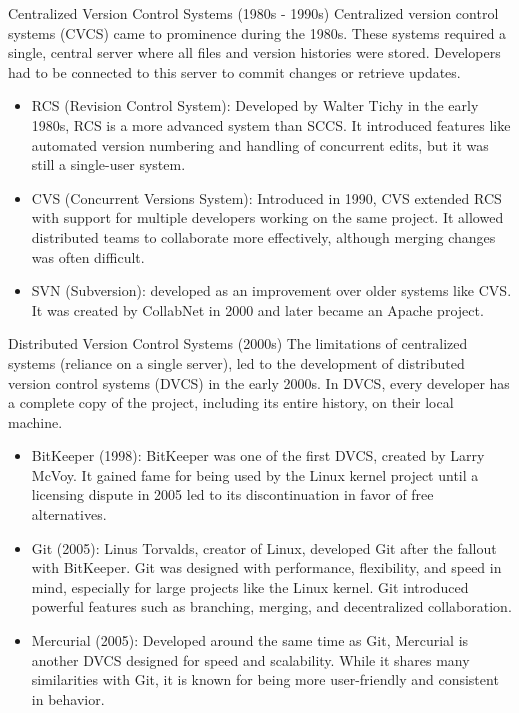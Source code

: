 \documentclass{beamer}
\begin{document}
\begin{frame}{Centralized Version Control Systems (1980s - 1990s)}
  Centralized version control systems (CVCS) came to prominence during the 1980s. These systems required a single, central server where all files and version histories were stored. Developers had to be connected to this server to commit changes or retrieve updates.
  \begin{itemize}
    \item RCS (Revision Control System): Developed by Walter Tichy in the early 1980s, RCS is a more advanced system than SCCS. It introduced features like automated version numbering and handling of concurrent edits, but it was still a single-user system.
    \item CVS (Concurrent Versions System): Introduced in 1990, CVS extended RCS with support for multiple developers working on the same project. It allowed distributed teams to collaborate more effectively, although merging changes was often difficult.
    \item SVN (Subversion): developed as an improvement over older systems like CVS. It was created by CollabNet in 2000 and later became an Apache project.
  \end{itemize}
\end{frame}

\begin{frame}{Distributed Version Control Systems (2000s)}
  The limitations of centralized systems (reliance on a single server), led to the development of distributed version control systems (DVCS) in the early 2000s. In DVCS, every developer has a complete copy of the project, including its entire history, on their local machine.
  \begin{itemize}
    \item BitKeeper (1998): BitKeeper was one of the first DVCS, created by Larry McVoy. It gained fame for being used by the Linux kernel project until a licensing dispute in 2005 led to its discontinuation in favor of free alternatives.
    \item Git (2005): Linus Torvalds, creator of Linux, developed Git after the fallout with BitKeeper. Git was designed with performance, flexibility, and speed in mind, especially for large projects like the Linux kernel. Git introduced powerful features such as branching, merging, and decentralized collaboration.
    \item Mercurial (2005): Developed around the same time as Git, Mercurial is another DVCS designed for speed and scalability. While it shares many similarities with Git, it is known for being more user-friendly and consistent in behavior.
  \end{itemize}
\end{frame}
\end{document}
